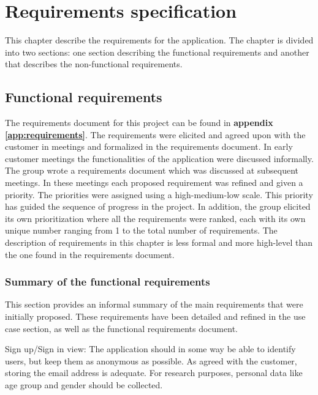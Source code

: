 
\chapter{Requirements specification}

This chapter describe the requirements for the application. The chapter is divided into two sections: one section describing the functional requirements and another that describes the non-functional requirements.

\section{Functional requirements}

The requirements document for this project can be found in \textbf{appendix \ref{app:requirements}}.  The requirements were elicited and agreed upon with the customer in meetings and formalized in the requirements document. In early customer meetings the functionalities of the application were discussed informally. The group wrote a requirements document which was discussed at subsequent meetings. In these meetings each proposed requirement was refined and given a priority. The priorities were assigned using a high-medium-low scale. This priority has guided the sequence of progress in the project. In addition, the group elicited its own prioritization where all the requirements were ranked, each with its own unique number ranging from 1 to the total number of requirements. The description of requirements in this chapter is less formal and more high-level than the one found in the requirements document. 

\subsection{Summary of the functional requirements}
\label{subsec:summary_functional_requirements}

This section provides an informal summary of the main requirements that were initially proposed. These requirements have been detailed and refined in the use case section, as well as the functional requirements document. \newline

Sign up/Sign in view: The application should in some way be able to identify users, but keep them as anonymous as possible. As agreed with the customer, storing the email address is adequate. For research purposes, personal data like age group and gender should be collected.\newline


